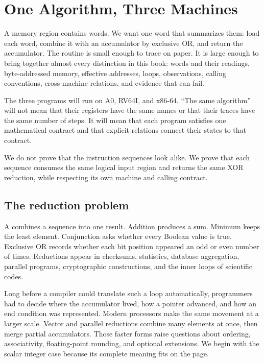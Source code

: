 \chapter{One Algorithm, Three Machines}
\label{ch:three-machines}

A memory region contains words. We want one word that summarizes them: load
each word, combine it with an accumulator by exclusive OR, and return the
accumulator. The routine is small enough to trace on paper. It is large enough
to bring together almost every distinction in this book: words and their
readings, byte-addressed memory, effective addresses, loops, observations,
calling conventions, cross-machine relations, and evidence that can fail.

The three programs will run on A0, RV64I, and x86-64. ``The same algorithm''
will not mean that their registers have the same names or that their traces
have the same number of steps. It will mean that each program satisfies one
mathematical contract and that explicit relations connect their states to that
contract.

\begin{keyidea}[title={One specification, three different movements}]
We do not prove that the instruction sequences look alike. We prove that each
sequence consumes the same logical input region and returns the same XOR
reduction, while respecting its own machine and calling contract.
\end{keyidea}

\section{The reduction problem}

A  combines a sequence into one result. Addition produces a
sum. Minimum keeps the least element. Conjunction asks whether every Boolean
value is true. Exclusive OR records whether each bit position appeared an odd
or even number of times. Reductions appear in checksums, statistics, database
aggregation, parallel programs, cryptographic constructions, and the inner
loops of scientific codes.

Long before a compiler could translate such a loop automatically, programmers
had to decide where the accumulator lived, how a pointer advanced, and how an
end condition was represented. Modern processors make the same movement at a
larger scale. Vector and parallel reductions combine many elements at once,
then merge partial accumulators. Those faster forms raise questions about
ordering, associativity, floating-point rounding, and optional extensions. We
begin with the scalar integer case because its complete meaning fits on the
page.

